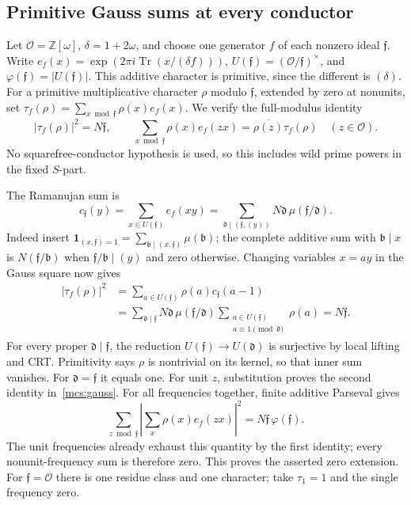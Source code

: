 \documentclass[11pt,oneside,openany]{book}
\theoremstyle{definition}\newtheorem{definition}[theorem]{Definition}
\theoremstyle{remark}\newtheorem{remark}[theorem]{Remark}
\begin{document}
\subsection{Primitive Gauss sums at every conductor}
Let $\mathcal O=\mathbb Z[\omega]$, $\delta=1+2\omega$, and choose one
generator $f$ of each nonzero ideal $\mathfrak f$. Write
$e_f(x)=\exp(2\pi i\operatorname{Tr}(x/(\delta f)))$,
$U(\mathfrak f)=(\mathcal O/\mathfrak f)^\times$, and
$\varphi(\mathfrak f)=|U(\mathfrak f)|$.
This additive character is primitive, since the different is $(\delta)$.
For a primitive multiplicative character $\rho$ modulo $\mathfrak f$,
extended by zero at nonunits, set
$\tau_f(\rho)=\sum_{x\bmod\mathfrak f}\rho(x)e_f(x)$.
We verify the full-modulus identity
\begin{equation}\label{mcs:gauss}
 |\tau_f(\rho)|^2=N\mathfrak f,\qquad
 \sum_{x\bmod\mathfrak f}\rho(x)e_f(zx)
       =\overline{\rho(z)}\tau_f(\rho)\quad(z\in\mathcal O).
\end{equation}
No squarefree-conductor hypothesis is used, so this includes wild
prime powers in the fixed $S$-part.

The Ramanujan sum is
\[
 c_{\mathfrak f}(y)=\sum_{x\in U(\mathfrak f)}e_f(xy)
   =\sum_{\mathfrak d\mid(\mathfrak f,(y))}
                   N\mathfrak d\,\mu(\mathfrak f/\mathfrak d).
\]
Indeed insert $\mathbf1_{(x,\mathfrak f)=1}
=\sum_{\mathfrak b\mid(x,\mathfrak f)}\mu(\mathfrak b)$;
the complete additive sum with $\mathfrak b\mid x$ is
$N(\mathfrak f/\mathfrak b)$ when
$\mathfrak f/\mathfrak b\mid(y)$ and zero otherwise.
Changing variables $x=ay$ in the Gauss square now gives
\begin{align*}
 |\tau_f(\rho)|^2
 &=\sum_{a\in U(\mathfrak f)}\rho(a)c_{\mathfrak f}(a-1)\\
 &=\sum_{\mathfrak d\mid\mathfrak f}N\mathfrak d\,
       \mu(\mathfrak f/\mathfrak d)
       \sum_{\substack{a\in U(\mathfrak f)\\a\equiv1\pmod{\mathfrak d}}}
                  \rho(a)=N\mathfrak f.
\end{align*}
For every proper $\mathfrak d\mid\mathfrak f$, the reduction
$U(\mathfrak f)\to U(\mathfrak d)$ is surjective by local lifting and CRT.
Primitivity says $\rho$ is nontrivial on its kernel, so that inner sum
vanishes. For $\mathfrak d=\mathfrak f$ it equals one.
For unit $z$, substitution proves the second identity in~\eqref{mcs:gauss}.
For all frequencies together, finite additive Parseval gives
\[
 \sum_{z\bmod\mathfrak f}
   \left|\sum_x\rho(x)e_f(zx)\right|^2
       =N\mathfrak f\,\varphi(\mathfrak f).
\]
The unit frequencies already exhaust this quantity by the first identity;
every nonunit-frequency sum is therefore zero. This proves the asserted
zero extension. For $\mathfrak f=\mathcal O$ there is one residue class
and one character; take $\tau_1=1$ and the single frequency zero.
\end{document}
